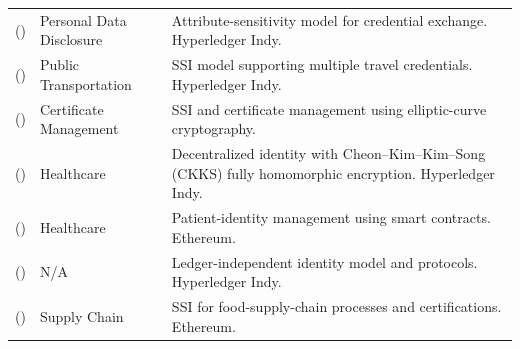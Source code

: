 \begin{longtable}{@{}>{\raggedright\arraybackslash}m{}>{\raggedright\arraybackslash}m{}>{\raggedright\arraybackslash}m{}@{}}
\addlinespace[5pt]
\cite{2020-enhancing-ssi} (\citeyear{2020-enhancing-ssi}) & Personal Data Disclosure & Attribute-sensitivity model for credential exchange. Hyperledger Indy. \\
\addlinespace[5pt]
\cite{2021-ssi-public-transport} (\citeyear{2021-ssi-public-transport}) & Public Transportation & SSI model supporting multiple travel credentials. Hyperledger Indy. \\
\addlinespace[5pt]
\cite{2021-an-innovative-did} (\citeyear{2021-an-innovative-did}) & Certificate Management & SSI and certificate management using elliptic-curve cryptography. \\
\addlinespace[5pt]
\cite{2021-did-prevent-secondary} (\citeyear{2021-did-prevent-secondary}) & Healthcare & Decentralized identity with Cheon--Kim--Kim--Song (CKKS) fully homomorphic encryption. Hyperledger Indy. \\
\addlinespace[5pt]
\cite{2021-health-ID-decentralized-id} (\citeyear{2021-health-ID-decentralized-id}) & Healthcare & Patient-identity management using smart contracts. Ethereum. \\
\addlinespace[5pt]
\cite{2021-dec-cross-net-idm} (\citeyear{2021-dec-cross-net-idm}) & N/A & Ledger-independent identity model and protocols. Hyperledger Indy. \\
\addlinespace[5pt]
\cite{2021-SSI-food-supply-chain} (\citeyear{2021-SSI-food-supply-chain}) & Supply Chain & SSI for food-supply-chain processes and certifications. Ethereum. \\
\end{longtable}
\endgroup

